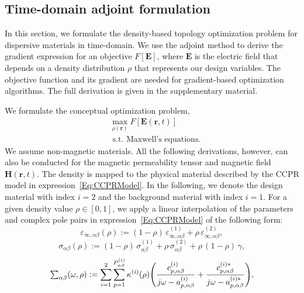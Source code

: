 \documentclass[aps,prl,twocolumn,superscriptaddress,longbibliography]{revtex4-1}
\begin{document}
\subsection{Time-domain adjoint formulation}\label{Sec:AdjFormulation}
In this section, we formulate the density-based topology optimization problem for dispersive materials in time-domain.
We use the adjoint method to derive the gradient expression for an objective $F[\mathbf{E}]$, where $\mathbf{E}$ is the electric field that depends on a density distribution $\rho$ that represents our design variables. The objective function and its gradient are needed for gradient-based optimization algorithms. The full derivation is given in the supplementary material.

 
We formulate the conceptual optimization problem, 
\begin{equation}
\begin{aligned}
& \max _{\rho(\mathbf{r})} F[\mathbf{E}(\mathbf{r}, t)] \\
& \text { s.t. Maxwell's equations.}
\end{aligned}
\end{equation}
We assume non-magnetic materials. 
All the following derivations, however, can also be conducted for the magnetic permeability tensor and magnetic field $\mathbf{H}(\mathbf{r}, t)$.
The density is mapped to the physical material described by the CCPR model in expression~\eqref{Eq:CCPRModel}. 
In the following, we denote the design material with index $i=2$ and the background material with index $i=1$. For a given density value $\rho \in [0, 1]$, we apply a linear interpolation of the parameters and complex pole pairs in expression~\ref{Eq:CCPRModel} of the following form:
\begin{equation}\label{Eq:eps_mixed}
\varepsilon_{\infty, \alpha \beta}(\rho) := (1-\rho)\,\varepsilon_{\infty, \alpha \beta}^{(1)} +  \rho\, \varepsilon_{\infty, \alpha \beta}^{(2)},
\end{equation}
\begin{equation}\label{Eq:sigma_mixed}
\sigma_{\alpha \beta}(\rho) := (1-\rho)\,\sigma_{\alpha \beta}^{(1)} +  \rho\, \sigma_{\alpha \beta}^{(2)} + \rho\,(1-\rho)\,\gamma,
\end{equation}
\begin{equation}\label{Eq:Poles_mixed}
{\textstyle \sum_{{\alpha \beta}}}(\omega, \rho): = \sum_{i=1}^{2}\sum_{p=1}^{P_{\alpha \beta}^{(i)}}\kappa^{(i)}(\rho)\!\left(\frac{c_{p, \alpha \beta}^{(i)}}{j \omega-a_{p, \alpha \beta}^{(i)}}+\frac{c_{p, \alpha \beta}^{(i)*}}{j \omega-a_{p, \alpha \beta}^{(i)*}}\right)\!,
\medskip
\end{equation}
\end{document}
